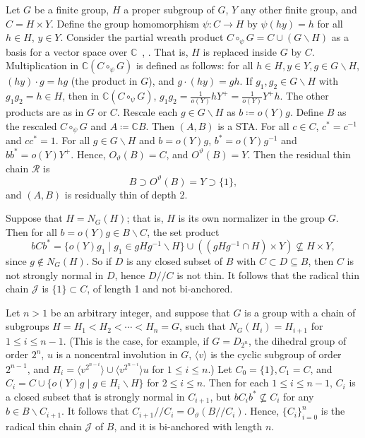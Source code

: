 \documentclass[ALCO,ThmDefs,Unicode,epreuves]{cedram}
\newcommand{\C}{{\mathbb C}}
\begin{document}
\begin{exam}
\label{ex:rad_length}
Let $G$ be a finite group, $H$ a proper subgroup of $G$, $Y$ any other
finite group, and $C = H\times Y$. Define the group homomorphism $\psi
: C \rightarrow H$ by $\psi(hy) = h$ for all $h \in H$, $y \in Y$.
Consider the partial wreath product $C \circ_{\psi}G = C\cup
(G\backslash H)$ as a basis for a vector space over $\C$~\cite
[Definition 4.1, Definition 4.2]{Blau1}, \cite [Definition~1.13,
Definition~2.4]{Blau3}. That is, $H$ is replaced inside $G$ by $C$.
Multiplication in $\C(C\circ_{\psi}G)$ is defined as follows: for all
$h \in H, y \in Y, g \in G\backslash H$, $(hy)\cdot g = hg$ (the product
in $G$), and $g\cdot (hy) = gh$. If $g_1, g_2 \in G\backslash H$ with
$g_1g_2 = h \in H$, then in $\C(C\circ_{\psi}G)$, $g_1g_2 =
\frac{1}{o(Y)}hY^+ = \frac{1}{o(Y)}Y^+h$. The other products are as in
$G$ or $C$. Rescale each $g \in G\backslash H$ as $b \coloneqq o(Y)g$. Define
$B$ as the rescaled $C\circ_{\psi}G$ and $A \coloneqq {\C}B$. Then $(A, B)$ is a
STA. For all $c \in C$, $c^* = c^{-1}$ and $cc^* = 1$. For all $g \in
G\backslash H$ and $b = o(Y)g$, $b^* = o(Y)g^{-1}$ and $bb^* = o(Y)Y^+$.
Hence, $O_{\vartheta}(B) = C$, and $O^{\vartheta}(B) = Y$. Then the
residual thin chain $\mathcal{R}$ is
\[
 B \supset O^{\vartheta}(B) = Y \supset \{1\},
\]
and $(A, B)$ is residually thin of depth 2.

Suppose that $H = N_G(H)$; that is, $H$ is its own normalizer in the
group $G$. Then for all $b = o(Y)g \in B\backslash C$, the set product
\[
bCb^* = \{o(Y)g_1 \mid g_1 \in gHg^{-1}\backslash H\} \cup
((gHg^{-1}\cap H)\times Y) 
\not\subseteq H \times Y,
\] 
since $g \notin N_G(H)$. So if $D$ is any closed subset of $B$ with $C
\subset D \subseteq B$, then $C$ is not strongly normal in $D$, hence
$D//C$ is not thin. It follows that the radical thin chain
$\mathcal{J}$ is $\{1\} \subset C$, of length 1 and not bi-anchored.

Let $n > 1$ be an arbitrary integer, and suppose that $G$ is a group with a chain of subgroups $H = H_1 < H_2 <
\cdots < H_n = G$, such that $N_G(H_i) = H_{i+1}$ for $1 \leq i \leq
n-1$. (This is the case, for example, if $G = D_{2^n}$, the dihedral
group of order $2^n$, $u$ is a noncentral involution in $G$, $\langle v
\rangle$ is the cyclic subgroup of order $2^{n-1}$, and $H_i = \langle
v^{2^{n-i}}\rangle \cup \langle v^{2^{n-i}}\rangle u$ for $1 \leq i \leq
n$.) Let $C_0 = \{1\}, C_1 = C$, and $C_i = C\cup \{o(Y)g \mid g \in
H_i\backslash H\}$ for $2 \leq i \leq n$. Then for each $1 \leq i \leq n-1$, $C_i$
is a closed subset that is strongly normal in $C_{i+1}$, but $bC_ib^*
\not\subseteq C_i$ for any $b \in B\backslash C_{i+1}$. It follows that
$C_{i+1}//C_i = O_{\vartheta}(B//C_i)$. Hence, $\{C_i\}_{i=0}^n$ is the
radical thin chain $\mathcal{J}$ of $B$, and it is bi-anchored with
length $n$. 
 
\end{exam}
\end{document}
